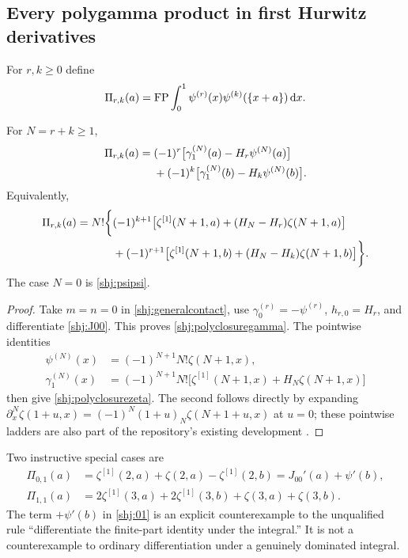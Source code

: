 \subsection{Every polygamma product in first Hurwitz derivatives}
For $r,k\ge0$ define
\[
\Pi_{r,k}(a)=\operatorname{FP}\int_0^1\psi^{(r)}(x)\psi^{(k)}(\{x+a\})\,\mathrm d x.
\]
\begin{corollary}\label{shj:polyclosure}
For $N=r+k\ge1$,
\begin{align}
\Pi_{r,k}(a)={}&(-1)^r\big[\gamma_1^{(N)}(a)-H_r\psi^{(N)}(a)\big]\notag\\
&+(-1)^k\big[\gamma_1^{(N)}(b)-H_k\psi^{(N)}(b)\big].
\label{shj:polyclosuregamma}
\end{align}
Equivalently,
\begin{align}
\Pi_{r,k}(a)=N!\bigg\{&(-1)^{k+1}\big[\zeta^{[1]}(N+1,a)
+(H_N-H_r)\zeta(N+1,a)\big]\notag\\
&+(-1)^{r+1}\big[\zeta^{[1]}(N+1,b)
+(H_N-H_k)\zeta(N+1,b)\big]\bigg\}.
\label{shj:polyclosurezeta}
\end{align}
The case $N=0$ is \eqref{shj:psipsi}.
\end{corollary}
\begin{proof}
Take $m=n=0$ in \eqref{shj:generalcontact}, use $\gamma_0^{(r)}=-\psi^{(r)}$, $h_{r,0}=H_r$, and differentiate \eqref{shj:J00}. This proves \eqref{shj:polyclosuregamma}. The pointwise identities
\begin{align*}
\psi^{(N)}(x)&=(-1)^{N+1}N!\zeta(N+1,x),\\
\gamma_1^{(N)}(x)&=(-1)^{N+1}N!
\big[\zeta^{[1]}(N+1,x)+H_N\zeta(N+1,x)\big]
\end{align*}
then give \eqref{shj:polyclosurezeta}. The second follows directly by expanding
$\partial_x^N\zeta(1+u,x)=(-1)^N(1+u)_N\zeta(N+1+u,x)$ at $u=0$; these pointwise ladders are also part of the repository's existing development \cite{stconv:shifted-report}.
\end{proof}

Two instructive special cases are
\begin{align}
\Pi_{0,1}(a)&=\zeta^{[1]}(2,a)+\zeta(2,a)-\zeta^{[1]}(2,b)
=J_{00}'(a)+\psi'(b),\label{shj:01}\\
\Pi_{1,1}(a)&=2\zeta^{[1]}(3,a)+2\zeta^{[1]}(3,b)
+\zeta(3,a)+\zeta(3,b).\label{shj:11}
\end{align}
The term $+\psi'(b)$ in \eqref{shj:01} is an explicit counterexample to the unqualified rule ``differentiate the finite-part identity under the integral.'' It is not a counterexample to ordinary differentiation under a genuinely dominated integral.

